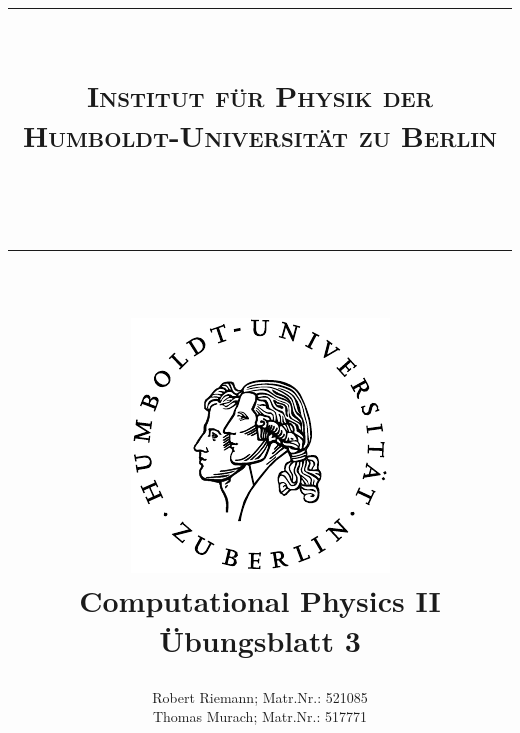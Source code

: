 \documentclass[a4paper,oneside,bibtotoc,smallheadings,pointlessnumbers,
halfparskip,DIV15]{scrartcl}
\newcommand{\lref}[1]{Listing (\ref{lst:#1})} %
\newcommand{\eref}[1]{Gl. (\ref{eqn:#1})} %
\begin{document}
\title{{\centering \rule{15cm}{0.001cm}\\
\Large{\textsc{Institut für Physik der
Humboldt-Universität zu Berlin}}}\\ \centering \rule{15cm}{0.001cm}\\
\vspace{15mm} \centering
\includegraphics[scale=0.9]{../../assets/siegel}\\
\vspace{18mm}
{\bf{\huge{Computational Physics II}}}\\
\vspace{12mm}
Übungsblatt 3\\
\vspace{15mm}
}
\author{Robert Riemann; Matr.Nr.: 521085\\
Thomas Murach; Matr.Nr.: 517771\vspace{18mm}}
\maketitle

\newpage


% 
% 
% 
% 
% 

%
%
% 
%
%
\end{document}
